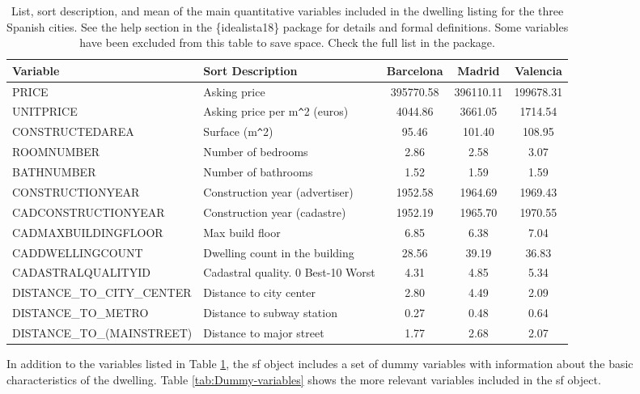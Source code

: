 \documentclass[Royal,times,sageh]{sagej}
\begin{document}
\begin{table}[ht]
\centering
\fontsize{8}{10}\selectfont
\begin{tabular}{>{\raggedright\arraybackslash}p{13em}>{\raggedright\arraybackslash}p{14em}ccc}
  \hline
Variable & Sort Description & Barcelona & Madrid & Valencia \\ 
  \hline
PRICE & Asking price & 395770.58 & 396110.11 & 199678.31 \\ 
  UNITPRICE & Asking price per m\verb|^|2 (euros) & 4044.86 & 3661.05 & 1714.54 \\ 
  CONSTRUCTEDAREA & Surface (m\verb|^|2) & 95.46 & 101.40 & 108.95 \\ 
  ROOMNUMBER & Number of bedrooms & 2.86 & 2.58 & 3.07 \\ 
  BATHNUMBER & Number of bathrooms & 1.52 & 1.59 & 1.59 \\ 
  CONSTRUCTIONYEAR & Construction year (advertiser) & 1952.58 & 1964.69 & 1969.43 \\ 
  CADCONSTRUCTIONYEAR & Construction year (cadastre) & 1952.19 & 1965.70 & 1970.55 \\ 
  CADMAXBUILDINGFLOOR & Max build floor & 6.85 & 6.38 & 7.04 \\ 
  CADDWELLINGCOUNT & Dwelling count in the building & 28.56 & 39.19 & 36.83 \\ 
  CADASTRALQUALITYID & Cadastral quality. 0 Best-10 Worst & 4.31 & 4.85 & 5.34 \\ 
  DISTANCE\_TO\_CITY\_CENTER & Distance to city center & 2.80 & 4.49 & 2.09 \\ 
  DISTANCE\_TO\_METRO & Distance to subway station & 0.27 & 0.48 & 0.64 \\ 
  DISTANCE\_TO\_(MAINSTREET) & Distance to major street & 1.77 & 2.68 & 2.07 \\ 
   \hline
\end{tabular}
\caption{List, sort description, and mean of the main quantitative variables included in the dwelling listing for the three Spanish cities. See the help section in the \{idealista18\} package for details and formal definitions. Some variables have been excluded from this table to save space. Check the full list in the package.\label{tab:variables}} 
\end{table}

In addition to the variables listed in Table \ref{tab:variables}, the sf
object includes a set of dummy variables with information about the
basic characteristics of the dwelling. Table \ref{tab:Dummy-variables}
shows the more relevant variables included in the sf object.
\end{document}
